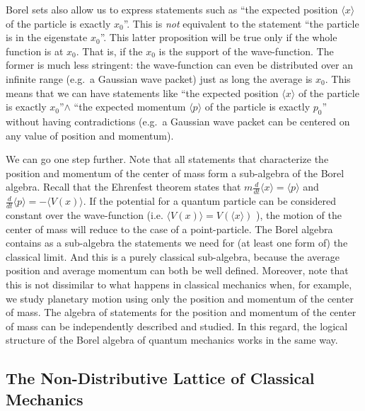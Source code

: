 \documentclass[11pt, executivepaper]{article}
\begin{document}
Borel sets also allow us to express statements such as ``the expected position $\langle x \rangle$ of the particle is exactly $x_0$''. This is \emph{not} equivalent to the statement ``the particle is in the eigenstate $x_0$''. This latter proposition will be true only if the whole function is at $x_0$. That is, if the $x_0$ is the support of the wave-function. The former is much less stringent: the wave-function can even be distributed over an infinite range (e.g.\ a Gaussian wave packet) just as long the average is $x_0$. This means that we can have statements like ``the expected position $\langle x \rangle$ of the particle is exactly $x_0$''$\wedge$ ``the expected momentum $\langle p \rangle$ of the particle is exactly $p_0$'' without having contradictions (e.g.\ a Gaussian wave packet can be centered on any value of position and momentum).

We can go one step further. Note that all statements that characterize the position and momentum of the center of mass form a sub-algebra of the Borel algebra. Recall that the Ehrenfest theorem states that $m \frac{d}{dt}\langle x \rangle = \langle p \rangle$ and $ \frac{d}{dt}\langle p \rangle = - \langle V(x) \rangle$. If the potential for a quantum particle can be considered constant over the wave-function (i.e. $\langle V(x) \rangle = V(\langle x \rangle)$ ), the motion of the center of mass will reduce to the case of a point-particle. The Borel algebra contains as a sub-algebra the statements we need for (at least one form of) the classical limit. And this is a purely classical sub-algebra, because the average position and average momentum can both be well defined. Moreover, note that this is not dissimilar to what happens in classical mechanics when, for example, we study planetary motion using only the position and momentum of the center of mass. The algebra of statements for the position and momentum of the center of mass can be independently described and studied. In this regard, the logical structure of the Borel algebra of quantum mechanics works in the same way.

\subsection{The Non-Distributive Lattice of Classical Mechanics}
\end{document}

